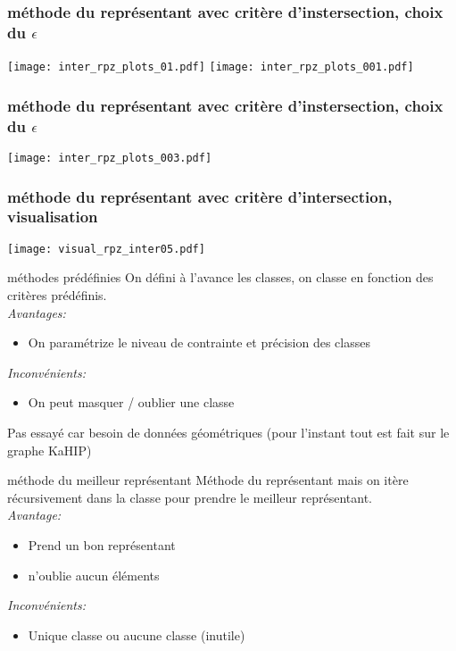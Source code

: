 \documentclass[aspectratio=169]{beamer}
\begin{document}
    \begin{frame}
        \frametitle{méthode du représentant avec critère d'instersection, choix du $\epsilon$}
        \texttt{[image: inter\_rpz\_plots\_01.pdf]}
        \texttt{[image: inter\_rpz\_plots\_001.pdf]}
    \end{frame}

    \begin{frame}
        \frametitle{méthode du représentant avec critère d'instersection, choix du $\epsilon$}
        \begin{center}
            \texttt{[image: inter\_rpz\_plots\_003.pdf]}
        \end{center}
    \end{frame}
    \begin{frame}
        \frametitle{méthode du représentant avec critère d'intersection, visualisation}
    
        \texttt{[image: visual\_rpz\_inter05.pdf]}
    
    \end{frame}
    \begin{frame}{méthodes prédéfinies}
        On défini à l'avance les classes, on classe en fonction des critères prédéfinis.\\
        \emph{Avantages:}
        \begin{itemize}
            \item On paramétrize le niveau de contrainte et précision des classes
        \end{itemize}
        \emph{Inconvénients:}
        \begin{itemize}
            \item On peut masquer / oublier une classe
        \end{itemize}

        Pas essayé car besoin de données géométriques (pour l'instant tout est fait sur le graphe KaHIP)
    \end{frame}

    \begin{frame}{méthode du meilleur représentant}
        Méthode du représentant mais on itère récursivement dans la classe pour prendre le meilleur représentant.\\
        \vspace*{5pt}
        \emph{Avantage:}
        \begin{itemize}
            \item Prend un bon représentant
            \item n'oublie aucun éléments
        \end{itemize}
        \emph{Inconvénients:}
        \begin{itemize}
            \item Unique classe ou aucune classe (inutile)
        \end{itemize}
    \end{frame}
\end{document}

